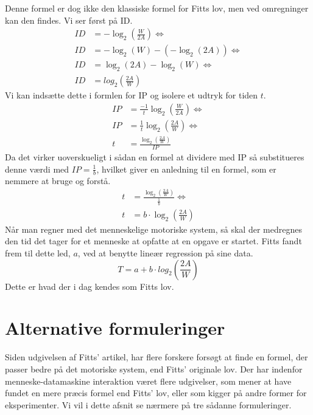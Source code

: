 Denne formel er dog ikke den klassiske formel for Fitts lov, men ved omregninger kan den findes. Vi ser først på ID.
\begin{align*}
ID &= -\log_2\left(\frac{W}{2A}\right) \Leftrightarrow\\
ID &= -\log_2\left(W\right)-\left(-\log_2\left(2A\right)\right) \Leftrightarrow\\
ID &= \log_2\left(2A\right)-\log_2\left(W\right) \Leftrightarrow\\
ID &= log_2\left(\frac{2A}{W}\right)
\end{align*}
Vi kan indsætte dette i formlen for IP og isolere et udtryk for tiden $t$.
\begin{align*}
IP &=\frac{-1}{t}\log_2\left(\frac{W}{2A}\right) \Leftrightarrow\\ 
IP &= \frac{1}{t}\log_2\left(\frac{2A}{W}\right) \Leftrightarrow\\ 
t &= \frac{\log_2\left(\frac{2A}{W}\right)}{IP}
\end{align*}
Da det virker uoverskueligt i sådan en formel at dividere med IP så substitueres denne værdi med $IP = \frac{1}{b}$, hvilket giver en anledning til en formel, som er nemmere at bruge og forstå.
\begin{align*}
t &= \frac{\log_2\left(\frac{2A}{W}\right)}{\frac{1}{b}} \Leftrightarrow\\ 
t &= b \cdot \log_2\left(\frac{2A}{W}\right)
\end{align*}
Når man regner med det menneskelige motoriske system, så skal der medregnes den tid det tager for et menneske at opfatte at en opgave er startet. Fitts fandt frem til dette led, $a$, ved at benytte lineær regression på sine data.
\begin{equation}
\label{eq:FittsLov}
T = a + b \cdot log_2\left(\frac{2A}{W}\right)
\end{equation}
Dette er hvad der i dag kendes som Fitts lov.

\section*{Alternative formuleringer}
Siden udgivelsen af Fitts’ artikel, har flere forskere forsøgt at finde en formel, der passer bedre på det motoriske system, end Fitts’ originale lov. Der har indenfor menneske-datamaskine interaktion været flere udgivelser, som mener at have fundet en mere præcis formel end Fitts’ lov, eller som kigger på andre former for eksperimenter. Vi vil i dette afsnit se nærmere på tre sådanne formuleringer.

